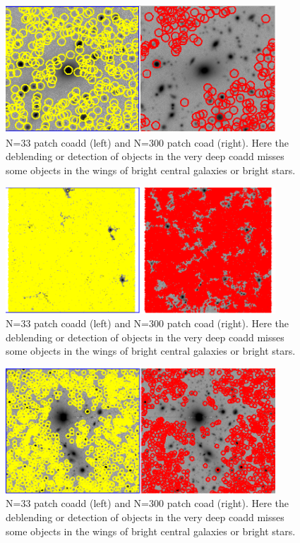  \begin{figure}
 \includegraphics[width=0.9\textwidth]{wobjects.png}
	 \caption{N=33 patch coadd (left) and N=300 patch coad (right).  Here the deblending or detection of objects in the very deep coadd misses some objects in the wings of bright central galaxies or bright stars.  \label{fig:deblend1}}
 \end{figure}

 \begin{figure}
 \includegraphics[width=0.9\textwidth]{full.png}
	 \caption{N=33 patch coadd (left) and N=300 patch coad (right).  Here the deblending or detection of objects in the very deep coadd misses some objects in the wings of bright central galaxies or bright stars.  \label{fig:deblend2}}
 \end{figure}

 \begin{figure}
 \includegraphics[width=0.9\textwidth]{deblend.png}
	 \caption{N=33 patch coadd (left) and N=300 patch coad (right).  Here the deblending or detection of objects in the very deep coadd misses some objects in the wings of bright central galaxies or bright stars.  \label{fig:deblend3}}
 \end{figure}


